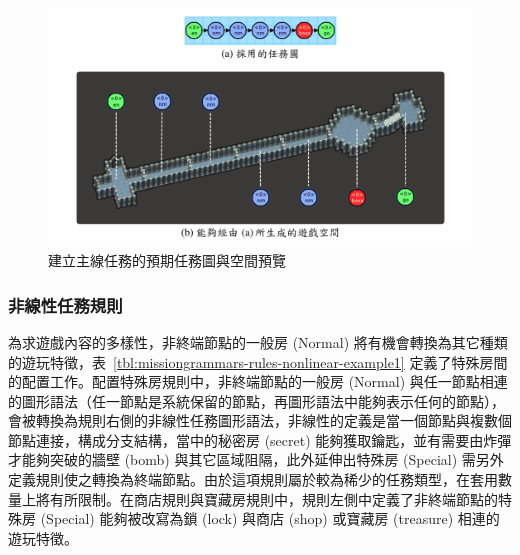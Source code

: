 \begin{figure}[!htb]
  \begin{center}
    \includegraphics[width=1.0\textwidth]{figures/missiongrammars-rules-linear-preview.pdf}
    \caption{建立主線任務的預期任務圖與空間預覽}
    \label{fig:missiongrammars-rules-linear-preview}
  \end{center}
\end{figure}

\subsubsection{非線性任務規則}
\label{sssec:method-missiongrammars-rules-nonlinearrules}

為求遊戲內容的多樣性，非終端節點的一般房 (Normal) 將有機會轉換為其它種類的遊玩特徵，表~\ref{tbl:missiongrammars-rules-nonlinear-example1} 定義了特殊房間的配置工作。配置特殊房規則中，非終端節點的一般房 (Normal) 與任一節點相連的圖形語法（任一節點是系統保留的節點，再圖形語法中能夠表示任何的節點），會被轉換為規則右側的非線性任務圖形語法，非線性的定義是當一個節點與複數個節點連接，構成分支結構，當中的秘密房 (secret) 能夠獲取鑰匙，並有需要由炸彈才能夠突破的牆壁 (bomb) 與其它區域阻隔，此外延伸出特殊房 (Special) 需另外定義規則使之轉換為終端節點。由於這項規則屬於較為稀少的任務類型，在套用數量上將有所限制。在商店規則與寶藏房規則中，規則左側中定義了非終端節點的特殊房 (Special) 能夠被改寫為鎖 (lock) 與商店 (shop) 或寶藏房 (treasure) 相連的遊玩特徵。

